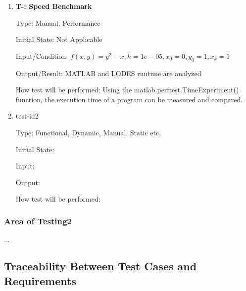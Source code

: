\documentclass[12pt, titlepage]{article}
\newcounter{tnum} %
\newcommand{\famname}{LODES} %
\begin{document}
\begin{enumerate}

\item{\textbf{T-\thetnum \label{t-speed}: Speed Benchmark}}

Type: Manual, Performance 
					
Initial State: Not Applicable
					
Input/Condition: $f(x, y) = y^2 - x, h = 1e-05, x_0 = 0, y_0 = 1, x_k = 1$
					
Output/Result: MATLAB and \famname{} runtime are analyzed
					
How test will be performed: Using the matlab.perftest.TimeExperiment() function, the execution time of a program can be measured and compared.
					
\item{test-id2\\}

Type: Functional, Dynamic, Manual, Static etc.
					
Initial State: 
					
Input: 
					
Output: 
					
How test will be performed: 

\end{enumerate}

\subsubsection{Area of Testing2}

...

\subsection{Traceability Between Test Cases and Requirements}


		
\end{document}
